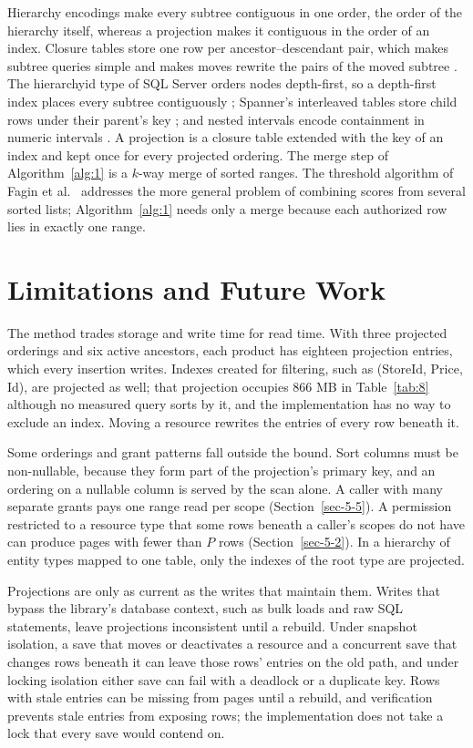 \documentclass[conference]{IEEEtran}
\begin{document}
Hierarchy encodings make every subtree contiguous in one order, the order of the hierarchy itself, whereas a projection makes it contiguous in the order of an index. Closure tables store one row per ancestor--descendant pair, which makes subtree queries simple and makes moves rewrite the pairs of the moved subtree \cite{ref35}. The hierarchyid type of SQL Server orders nodes depth-first, so a depth-first index places every subtree contiguously \cite{ref36}; Spanner's interleaved tables store child rows under their parent's key \cite{ref37}; and nested intervals encode containment in numeric intervals \cite{ref38}. A projection is a closure table extended with the key of an index and kept once for every projected ordering. The merge step of Algorithm~\ref{alg:1} is a \(k\)-way merge of sorted ranges. The threshold algorithm of Fagin et al.~\cite{ref39} addresses the more general problem of combining scores from several sorted lists; Algorithm~\ref{alg:1} needs only a merge because each authorized row lies in exactly one range.

\section{Limitations and Future Work}\label{sec-9}

The method trades storage and write time for read time. With three projected orderings and six active ancestors, each product has eighteen projection entries, which every insertion writes. Indexes created for filtering, such as (StoreId, Price, Id), are projected as well; that projection occupies 866 MB in Table~\ref{tab:8} although no measured query sorts by it, and the implementation has no way to exclude an index. Moving a resource rewrites the entries of every row beneath it.

Some orderings and grant patterns fall outside the bound. Sort columns must be non-nullable, because they form part of the projection's primary key, and an ordering on a nullable column is served by the scan alone. A caller with many separate grants pays one range read per scope (Section~\ref{sec-5-5}). A permission restricted to a resource type that some rows beneath a caller's scopes do not have can produce pages with fewer than \(P\) rows (Section~\ref{sec-5-2}). In a hierarchy of entity types mapped to one table, only the indexes of the root type are projected.

Projections are only as current as the writes that maintain them. Writes that bypass the library's database context, such as bulk loads and raw SQL statements, leave projections inconsistent until a rebuild. Under snapshot isolation, a save that moves or deactivates a resource and a concurrent save that changes rows beneath it can leave those rows' entries on the old path, and under locking isolation either save can fail with a deadlock or a duplicate key. Rows with stale entries can be missing from pages until a rebuild, and verification prevents stale entries from exposing rows; the implementation does not take a lock that every save would contend on.
\end{document}
